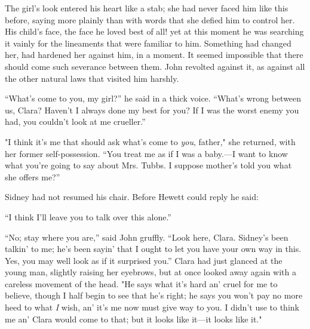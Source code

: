 The girl's look entered his heart like a stab; she had never faced him
like this before, saying more plainly than with words that she defied
him to control her. His child's face, the face he loved best of all! yet
at this moment he was searching it vainly
{\protect\hypertarget{65}{}{}}for the lineaments that were familiar to
him. Something had changed her, had hardened her against him, in a
moment. It seemed impossible that there should come such severance
between them. John revolted against it, as against all the other natural
laws that visited him harshly.

``What's come to you, my girl?'' he said in a thick voice. ``What's
wrong between us, Clara? Haven't I always done my best for you? If I was
the worst enemy you had, you couldn't look at me crueller.''

"I think it's me that should ask what's come to \emph{you}, father," she
returned, with her former self-possession. ``You treat me as if I was a
baby.---I want to know what you're going to say about Mrs. Tubbs. I
suppose mother's told you what she offers me?''

Sidney had not resumed his chair. Before Hewett could reply he said:

``I think I'll leave you to talk over this alone.''

``No; stay where you are,'' said John
{\protect\hypertarget{66}{}{}}gruffly. ``Look here, Clara. Sidney's been
talkin' to me; he's been sayin' that I ought to let you have your own
way in this. Yes, you may well look as if it surprised you.'' Clara had
just glanced at the young man, slightly raising her eyebrows, but at
once looked away again with a careless movement of the head. "He says
what it's hard an' cruel for me to believe, though I half begin to see
that he's right; he says you won't pay no more heed to what \emph{I}
wish, an' it's me now must give way to you. I didn't use to think me an'
Clara would come to that; but it looks like it---it looks like it."

